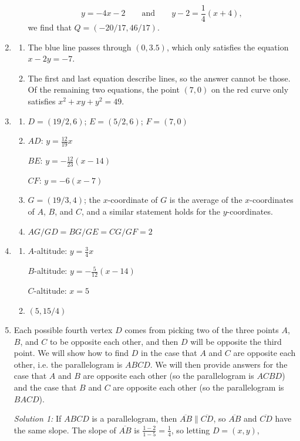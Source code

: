 \begin{enumerate}
\begin{enumerate}
\begin{equation*}
y = -4x - 2\qquad\text{and}\qquad y - 2 = \frac{1}{4}(x + 4),
\end{equation*}
we find that $Q = \boxed{(-20/17, 46/17)}$.
\end{enumerate}
\item \begin{enumerate}
\item The blue line passes through $(0, 3.5)$, which only satisfies the equation $\boxed{x - 2y = -7}$.
\item The first and last equation describe lines, so the answer cannot be those. Of the remaining two equations, the point $(7,0)$ on the red curve only satisfies $\boxed{x^2 + xy + y^2 = 49}$.
\end{enumerate}
\item \begin{enumerate}
\item $D = (19/2, 6)$; $E = (5/2, 6)$; $F = (7,0)$
\item $AD$: $y = \frac{12}{19}x$\par
$BE$: $y = -\frac{12}{23}(x - 14)$\par 
$CF$: $y = -6(x - 7)$
\item $G = (19/3, 4)$; the $x$-coordinate of $G$ is the average of the $x$-coordinates of $A$, $B$, and $C$, and a similar statement holds for the $y$-coordinates.
\item $AG/GD = BG/GE = CG/GF = 2$
\end{enumerate}
\item \begin{enumerate}
\item $A$-altitude: $y = \frac{3}{4}x$\par 
$B$-altitude: $y = -\frac{5}{12}(x - 14)$\par 
$C$-altitude: $x = 5$
\item $(5, 15/4)$
\end{enumerate}
\item Each possible fourth vertex $D$ comes from picking two of the three points $A$, $B$, and $C$ to be opposite each other, and then $D$ will be opposite the third point. We will show how to find $D$ in the case that $A$ and $C$ are opposite each other, i.e. the parallelogram is $ABCD$. We will then provide answers for the case that $A$ and $B$ are opposite each other (so the parallelogram is $ACBD$) and the case that $B$ and $C$ are opposite each other (so the parallelogram is $BACD$).\par 
\emph{Solution 1:} If $ABCD$ is a parallelogram, then $\overline{AB}\parallel\overline{CD}$, so $\overline{AB}$ and $\overline{CD}$ have the same slope. The slope of $\overline{AB}$ is $\frac{1 - 2}{1 - 5} = \frac{1}{4}$, so letting $D = (x,y)$,

\end{enumerate}
